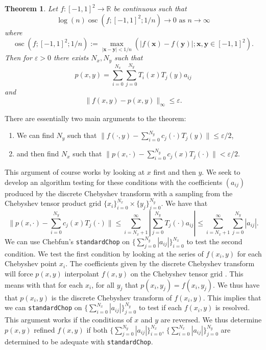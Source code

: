 \documentclass{article}
\DeclareMathOperator*{\osc}{osc}
\newtheorem{theorem}{Theorem}[section]
\newcommand{\R}{\mathbb{R}}
\newcommand{\vect}[1]{\mathbf{#1}}
\begin{document}
\begin{theorem} 
Let $f:[-1,1]^2 \to \R$ be continuous such that
$$
\log(n)\osc(f;[-1,1]^2;1/n)\to 0 \text{ as } n\to \infty
$$
where
$$
\osc(f;[-1,1]^2;1/n):=\max_{|{\vect{x}-\vect{y}}|<1/n}(|f(\vect{x})-f(\vect{y})|;\vect{x},\vect{y} \in [-1,1]^2).
$$
Then for $\varepsilon>0$ there exists $N_x,N_y$ such that
$$
p(x,y) = \sum_{i=0}^{N_x} \sum_{j=0}^{N_y} T_i(x)T_j(y)a_{ij}
$$
and
$$
\|f(x,y)-p(x,y)\|_{\infty} \leq \varepsilon.
$$
 \end{theorem}
There are essentially two main arguments to the theorem:
\begin{enumerate}
\item We can find $N_y$ such that $\|f(\cdot,y) -\sum_{i=0}^{N_y} c_j(\cdot)T_j(y) \| \leq \varepsilon/2$,
\item and then find $N_x$ such that $\|p(x,\cdot) - \sum_{i=0}^{N_y} c_j(x)T_j(\cdot)\|<\varepsilon/2$.
\end{enumerate}
This argument of course works by looking at $x$ first and then $y$. We seek to develop an algorithm testing for these conditions with the coefficients $(a_{ij})$ produced by the discrete Chebyshev transform with a sampling from the Chebyshev tensor product grid $\{x_i\}_{i=0}^{N_x} \times \{y_j\}_{j=0}^{N_y}$. We have that
\begin{equation}
\|p(x,\cdot) - \sum_{i=0}^{N_y} c_j(x)T_j(\cdot)\| \leq \sum_{i=N_x+1}^{\infty} | \sum_{j=0}^{N_y} T_j(\cdot) a_{ij}	 | \leq \sum_{i=N_x+1}^{\infty} \sum_{j=0}^{N_y} |a_{ij}|.
\end{equation}
We can use Chebfun's {\tt standardChop} on $\{\sum_{j=0}^{N_y} |a_{ij}|\}_{i=0}^{N_x}$ to test the second condition. We test the first condition by looking at the series of $f(x_i,y)$ for each Chebyshev point $x_i$. The coefficients given by the discrete Chebyshev transform will force $p(x,y)$ interpolant $f(x,y)$ on the Chebyshev tensor grid \cite{mason2002chebyshev}. This means with that for each $x_i$, for all $y_j$ that $p(x_i,y_j) = f(x_i,y_j)$. We thus have that $p(x_i,y)$ is the discrete Chebyshev transform of $f(x_i,y)$. This implies that we can {\tt standardChop} on $\{\sum_{i=0}^{N_x} |a_{ij}|\}_{j=0}^{N_y}$ to test if each $f(x_i,y)$ is resolved. This argument works if the conditions of $x$ and $y$ are reversed. We thus determine $p(x,y)$ refined $f(x,y)$ if both $\{\sum_{j=0}^{N_y} |a_{ij}|\}_{i=0}^{N_x}$, $\{\sum_{i=0}^{N_x} |a_{ij}|\}_{j=0}^{N_y}$ are determined to be adequate with {\tt standardChop}.


\end{document}

